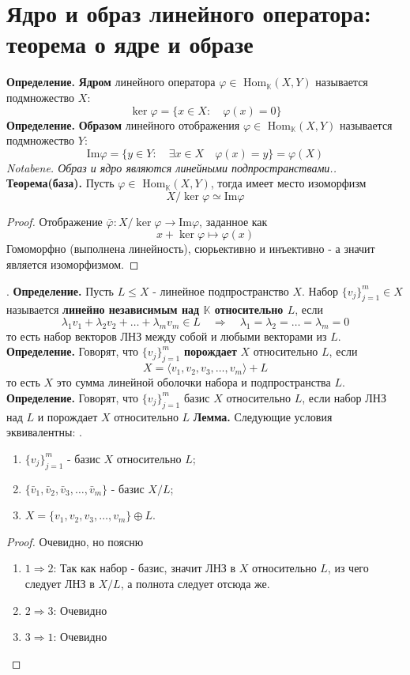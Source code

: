 \documentclass{article}
\newcommand*{\lemma}[1]{\textbf{Лемма.} #1. \newline}
\newcommand*{\theorem}[2]{\textbf{Теорема#1. } #2 \newline}
\newcommand*{\notabene}[1]{\textit{Notabene. #1.} \newline}
\newcommand*{\definition}[1]{\textbf{Определение.} #1 \newline}
\newcommand*{\Hom}[2]{Hom$_\mathbb{K}(#1, #2)$}
\begin{document}
\section{Ядро и образ линейного оператора: теорема о ядре и образе}
\definition{\textbf{Ядром} линейного оператора $\varphi \in$ \Hom{X}{Y} называется подмножество $X$: }
$$
    \ker \varphi = \{ x \in X: \quad \varphi(x) = 0\}
$$
\definition{\textbf{Образом} линейного отображения $\varphi \in$ \Hom{X}{Y} называется подмножество $Y$:}
$$
    \text{Im} \varphi = \{ y \in Y: \quad \exists x \in X \quad \varphi(x) = y\} = \varphi(X)
$$
\notabene{Образ и ядро являются линейными подпространствами.}
\theorem{(база)}{Пусть $\varphi \in$ \Hom{X}{Y}, тогда имеет место изоморфизм}
$$
    X/\ker \varphi \simeq \text{Im} \varphi
$$
\begin{proof}
    Отображение $\bar \varphi: X/\ker \varphi \to \text{Im} \varphi$, заданное как 
    $$
        x + \ker \varphi \mapsto \varphi(x)
    $$
    Гомоморфно (выполнена линейность), сюрьективно и инъективно - а значит является изоморфизмом.
\end{proof}
.\newline
\definition{Пусть $L \leq X$ - линейное подпространство $X$. Набор $\{ v_j \}^m_{j = 1} \in X$ называется \textbf{линейно независимым над $\mathbb{K}$ относительно $L$}, если}
$$
    \lambda_1 v_1 + \lambda_2 v_2 + \dots + \lambda_m v_m \in L \quad \Rightarrow \quad \lambda_1 = \lambda_2 = \dots = \lambda_m = 0
$$
то есть набор векторов ЛНЗ между собой и любыми векторами из $L$.
\newline
\newline
\definition{Говорят, что $\{ v_j \}^m_{j = 1}$ \textbf{порождает} $X$ относительно $L$, если}
$$
    X = \langle v_1, v_2, v_3, \dots, v_m \rangle + L
$$
то есть $X$ это сумма линейной оболочки набора и подпространства $L$.
\newline 
\newline 
\definition{Говорят, что $\{ v_j \}^m_{j = 1}$ базис $X$ относительно $L$, если набор ЛНЗ над $L$ и порождает $X$ относительно $L$}
\lemma{Следующие условия эквивалентны: }
\begin{enumerate}
    \item $\{ v_j \}^m_{j = 1}$ - базис $X$ относительно $L$;
    \item $\{ \bar v_1, \bar v_2, \bar v_3, \dots, \bar v_m \}$ - базис $X/L$;
    \item $X = \{ v_1, v_2, v_3, \dots, v_m\} \oplus L$.
\end{enumerate}
\begin{proof}
    Очевидно, но поясню
    \begin{enumerate}
        \item $1 \Rightarrow 2$: 
        Так как набор - базис, значит ЛНЗ в $X$ относительно $L$, из чего следует ЛНЗ в $X/L$, а полнота следует отсюда же. 
        \item $2 \Rightarrow 3$: 
        Очевидно
        \item $3 \Rightarrow 1$: 
        Очевидно
    \end{enumerate}
\end{proof}
\end{document}
